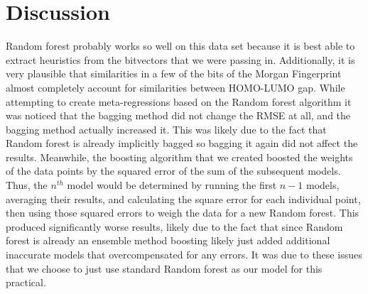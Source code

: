 \documentclass[11pt]{article}
\begin{document}
\section{Discussion}
Random forest probably works so well on this data set because it is best able to extract heuristics from the bitvectors that we were passing in. Additionally, it is very plausible that similarities in a few of the bits of the Morgan Fingerprint almost completely account for similarities between HOMO-LUMO gap.
While attempting to create meta-regressions based on the Random forest algorithm it was noticed that the bagging method did not change the RMSE at all, and the bagging method actually increased it. This was likely due to the fact that Random forest is already implicitly bagged so bagging it again did not affect the results. Meanwhile, the boosting algorithm that we created boosted the weights of the data points by the squared error of the sum of the subsequent models. Thus, the $n^{th}$ model would be determined by running the first $n-1$ models, averaging their results, and calculating the square error for each individual point, then using those squared errors to weigh the data for a new Random forest. This produced significantly worse results, likely due to the fact that since Random forest is already an ensemble method boosting likely just added additional inaccurate models that overcompensated for any errors. It was due to these issues that we choose to just use standard Random forest as our model for this practical.
\end{document}
